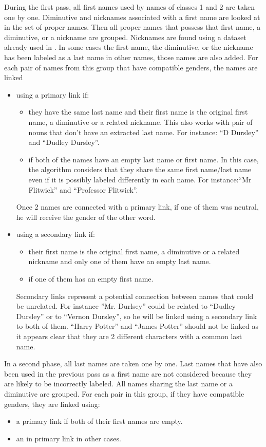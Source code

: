 \documentclass[a4paper, 12pt]{report}
\begin{document}
During the first pass, all first names used by names of classes 1 and 2 are taken one by one.
Diminutive and nicknames associated with a first name are looked at in the set of proper names.
Then all proper names that possess that first name, a diminutive, or a nickname are grouped.
Nicknames are found using a dataset \citep{dbNickname} already used in \cite{structure_clustering}.
In some cases the first name, the diminutive, or the nickname has been labeled as a last name in other names, those names are also added.
For each pair of names from this group that have compatible genders, the names are linked
\begin{itemize}
\item
using a primary link if:
\begin{itemize}
\item they have the same last name and their first name is the original first name, a diminutive or a related nickname.
This also works with pair of nouns that don't have an extracted last name. For instance: ``D Dursley'' and ``Dudley Dursley''.
\item if both of the names have an empty last name or first name.
In this case, the algorithm considers that they share the same first name/last name even if it is possibly labeled differently in each name.
For instance:``Mr Flitwick'' and ``Professor Flitwick''.
\end{itemize}
Once 2 names are connected with a primary link, if one of them was neutral, he will receive the gender of the other word.
\item
using a secondary link if:
\begin{itemize}
\item their first name is the original first name, a diminutive or a related nickname and only one of them have an empty last name.
\item if one of them has an empty first name.
\end{itemize}
Secondary links represent a potential connection between names that could be unrelated.
For instance ''Mr. Durlsey'' could be related to ``Dudley Dursley'' or to ``Vernon Dursley'', so he will be linked using a secondary link to both of them.
``Harry Potter'' and ``James Potter'' should not be linked as it appears clear that they are 2 different characters with a common last name.
\end{itemize}

In a second phase, all last names are taken one by one.
Last names that have also been used in the previous pass as a first name are not considered because they are likely to be incorrectly labeled.
All names sharing the last name or a diminutive are grouped. For each pair in this group, if they have compatible genders, they are linked using:
\begin{itemize}
\item a primary link if both of their first names are empty.
\item an in primary link in other cases.
\end{itemize}
\end{document}
